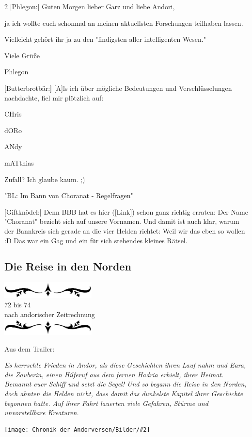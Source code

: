 \documentclass[10pt, a4paper, oneside]{book}
\newcommand{\bildmitts}[2][height=0.32\textwidth,width=0.48\textwidth,keepaspectratio]{%
    \begin{center}
        \texttt{[image: Chronik der Andorversen/Bilder/\#2]}
    \end{center}
}
\newcommand{\az}[1]{%
    \begin{center}
        \includegraphics[width=180px]{Chronik der Andorversen/verzierung1.png}\\
        {\Huge #1} \\
        {nach andorischer Zeitrechnung}\\
        \includegraphics[width=180px]{Chronik der Andorversen/verzierung2.png}
    \end{center}
    \extramarks{}{#1 a.Z.}
}
\begin{document}
\begin{multicols}{2}
[Phlegon:] Guten Morgen lieber Garz und liebe Andori,

ja ich wollte euch schonmal an meinen aktuellsten Forschungen teilhaben lassen.

Vielleicht gehört ihr ja zu den "findigsten aller intelligenten Wesen."

Viele Grüße

Phlegon

[Butterbrotbär:] [A]ls ich über mögliche Bedeutungen und Verschlüsselungen nachdachte, fiel mir plötzlich auf:

CHris

dORo

ANdy

mATthias

Zufall? Ich glaube kaum. ;)

\begin{center}
    "BL: Im Bann von Choranat - Regelfragen"
\end{center}

[Giftknödel:] Denn BBB hat es hier ([Link]) schon ganz richtig erraten: Der Name "Choranat" bezieht sich auf unsere Vornamen. Und damit ist auch klar, warum der Bannkreis sich gerade an die vier Helden richtet: Weil wir das eben so wollen :D Das war ein Gag und ein für sich stehendes kleines Rätsel.




\begin{chapterbox}

    \chapter{Die Reise in den Norden}

    \az{72 bis 74}

    \begin{center}
        Aus dem Trailer:
    \end{center}

    \textit{Es herrschte Frieden in Andor, als diese Geschichten ihren Lauf nahm und Eara, die Zauberin, einen Hilferuf aus dem fernen Hadria erhielt, ihrer Heimat. Bemannt euer Schiff und setzt die Segel! Und so begann die Reise in den Norden, doch ahnten die Helden nicht, dass damit das dunkelste Kapitel ihrer Geschichte begonnen hatte. Auf ihrer Fahrt lauerten viele Gefahren, Stürme und unvorstellbare Kreaturen.}




    \bildmitts[width=\textwidth]{Die Reise in den Norden textless.jpg}


\end{chapterbox}
\end{multicols}
\end{document}
